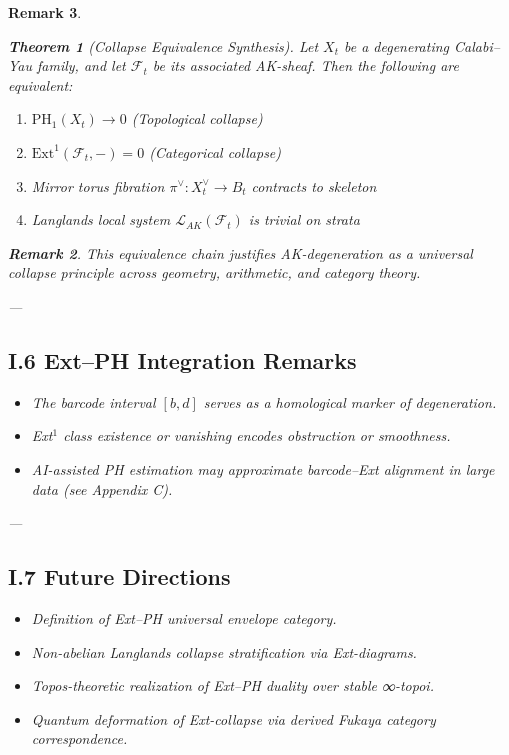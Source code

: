 \documentclass[11pt]{article}
\newtheorem{theorem}{Theorem}[section]
\newtheorem{remark}[theorem]{Remark}
\begin{document}
\begin{remark}
\begin{theorem}[Collapse Equivalence Synthesis]
Let $X_t$ be a degenerating Calabi–Yau family, and let $\mathcal{F}_t$ be its associated AK-sheaf. Then the following are equivalent:
\begin{enumerate}
  \item $\mathrm{PH}_1(X_t) \to 0$ (Topological collapse)
  \item $\mathrm{Ext}^1(\mathcal{F}_t, -) = 0$ (Categorical collapse)
  \item Mirror torus fibration $\pi^\vee: X_t^\vee \to B_t$ contracts to skeleton
  \item Langlands local system $\mathcal{L}_{AK}(\mathcal{F}_t)$ is trivial on strata
\end{enumerate}
\end{theorem}

\begin{remark}
This equivalence chain justifies AK-degeneration as a universal collapse principle across geometry, arithmetic, and category theory.
\end{remark}

---

\subsection*{I.6 Ext–PH Integration Remarks}

\begin{itemize}
  \item The barcode interval $[b,d]$ serves as a homological marker of degeneration.
  \item Ext${}^1$ class existence or vanishing encodes obstruction or smoothness.
  \item AI-assisted PH estimation may approximate barcode–Ext alignment in large data (see Appendix C).
\end{itemize}

---

\subsection*{I.7 Future Directions}

\begin{itemize}
  \item Definition of Ext–PH universal envelope category.
  \item Non-abelian Langlands collapse stratification via Ext-diagrams.
  \item Topos-theoretic realization of Ext–PH duality over stable ∞-topoi.
  \item Quantum deformation of Ext-collapse via derived Fukaya category correspondence.
\end{itemize}


\end{remark}
\end{document}
